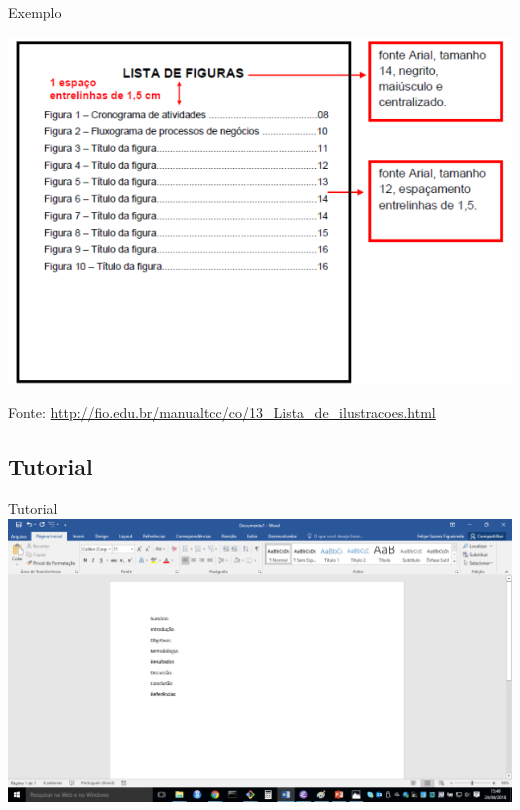 \documentclass{beamer}
\begin{document}
\begin{frame}{\scriptsize }
  \begin{exampleblock}{Exemplo}
    \begin{center}
      \includegraphics[height=0.8\textheight]{EstruturaII/lista_figuras}
    \end{center}
  \end{exampleblock}

  \vfill
  \scriptsize
  \hfill Fonte: {\tiny \url{http://fio.edu.br/manualtcc/co/13_Lista_de_ilustracoes.html}}
\end{frame}

\subsection{Tutorial}

\begin{frame}{\scriptsize Tutorial}
  \includegraphics[height=0.9\textheight]{EstruturaII/sumario1}
\end{frame}
\end{document}
